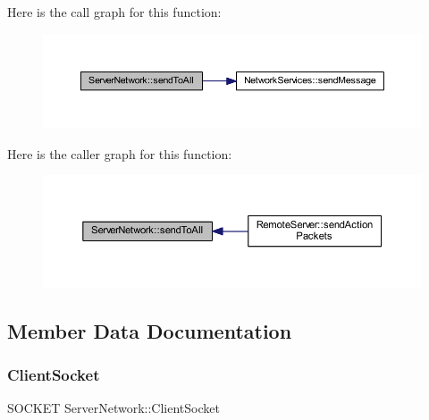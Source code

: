 Here is the call graph for this function\+:
\nopagebreak
\begin{figure}[H]
\begin{center}
\leavevmode
\includegraphics[width=350pt]{class_server_network_a33f470f2d8b21035731c2dcce5348d43_cgraph}
\end{center}
\end{figure}
Here is the caller graph for this function\+:
\nopagebreak
\begin{figure}[H]
\begin{center}
\leavevmode
\includegraphics[width=350pt]{class_server_network_a33f470f2d8b21035731c2dcce5348d43_icgraph}
\end{center}
\end{figure}


\subsection{Member Data Documentation}
\mbox{\label{class_server_network_a432ddc13be160e45b4e1f61a117213d3}} 
\subsubsection{\texorpdfstring{Client\+Socket}{ClientSocket}}
{\footnotesize\ttfamily S\+O\+C\+K\+ET Server\+Network\+::\+Client\+Socket}

\mbox{\label{class_server_network_ad90cce9fc9f5945db77450548c0e0f63}} 
